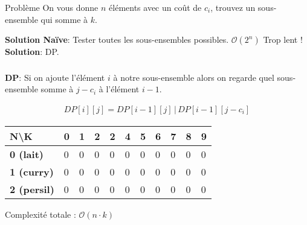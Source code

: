 
\begin{frame}
    \frametitle{\problemtitle}
    \begin{block}
        {Problème} On vous donne $n$ éléments avec un coût de $c_i$, trouvez un sous-ensemble qui somme à $k$.
    \end{block}
    \pause
    \textbf{Solution Naïve}: Tester toutes les sous-ensembles possibles. $\mathcal{O}(2^n)$ Trop lent ! \\
    \pause
    \textbf{Solution}: DP. \\
    \pause
\end{frame}
\begin{frame}
    \frametitle{\problemtitle}
    \textbf{DP}: Si on ajoute l'élément $i$ à notre sous-ensemble alors on regarde quel sous-ensemble somme à $j-c_i$ à l'élément $i-1$.
    
    \begin{align*}
        DP[i][j] = DP[i-1][j] \,|\, DP[i-1][j-c_i]
    \end{align*}
    
    \begin{table}[]
      \begin{tabular}{|l|l|l|l|l|l|l|l|l|l|l|}
      \hline
      \textbf{N\textbackslash{}K} & \textbf{0} & \textbf{1} & \textbf{2} & \textbf{2} & \textbf{4} & \textbf{5} & \textbf{6} & \textbf{7} & \textbf{8} & \textbf{9} \\ \hline
      \textbf{0 (lait)}   & 0 & 0 & 0 & 0 & 0 & 0 & 0 & 0 & 0 & 0 \\ \hline
      \textbf{1 (curry)}  & 0 & 0 & 0 & 0 & 0 & 0 & 0 & 0 & 0 & 0 \\ \hline
      \textbf{2 (persil)} & 0 & 0 & 0 & 0 & 0 & 0 & 0 & 0 & 0 & 0 \\ \hline
      \end{tabular}
    \end{table}
    
    Complexité totale : $\mathcal{O}(n \cdot k)$
\end{frame}
